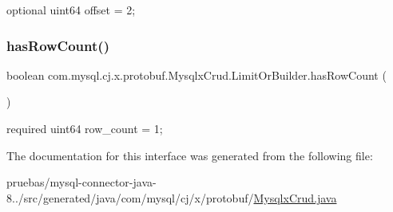 {\ttfamily optional uint64 offset = 2;} \mbox{\label{interfacecom_1_1mysql_1_1cj_1_1x_1_1protobuf_1_1_mysqlx_crud_1_1_limit_or_builder_af9a2614f49f0fbf2cfc5fab29f73634f}} 
\subsubsection{\texorpdfstring{has\+Row\+Count()}{hasRowCount()}}
{\footnotesize\ttfamily boolean com.\+mysql.\+cj.\+x.\+protobuf.\+Mysqlx\+Crud.\+Limit\+Or\+Builder.\+has\+Row\+Count (\begin{DoxyParamCaption}{ }\end{DoxyParamCaption})}

{\ttfamily required uint64 row\+\_\+count = 1;} 

The documentation for this interface was generated from the following file\+:\begin{DoxyCompactItemize}
\item 
pruebas/mysql-\/connector-\/java-\/8../src/generated/java/com/mysql/cj/x/protobuf/\mbox{\hyperlink{_mysqlx_crud_8java}{Mysqlx\+Crud.\+java}}\end{DoxyCompactItemize}
